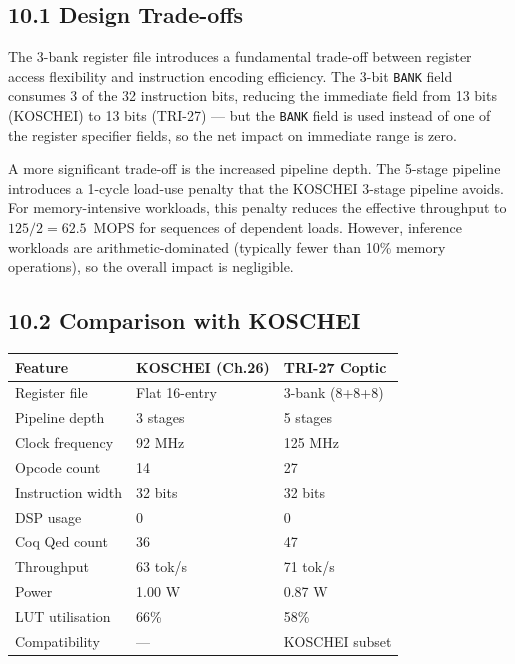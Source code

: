 \subsection{10.1 Design Trade-offs}\label{fa_71:trade-offs}

The 3-bank register file introduces a fundamental trade-off
between register access flexibility and instruction encoding
efficiency. The 3-bit \texttt{BANK} field consumes 3 of the 32
instruction bits, reducing the immediate field from 13 bits
(KOSCHEI) to 13 bits (TRI-27) --- but the \texttt{BANK} field
is used instead of one of the register specifier fields, so the
net impact on immediate range is zero.

A more significant trade-off is the increased pipeline depth.
The 5-stage pipeline introduces a 1-cycle load-use penalty that
the KOSCHEI 3-stage pipeline avoids. For memory-intensive
workloads, this penalty reduces the effective throughput to
\(125 / 2 = 62.5\)~MOPS for sequences of dependent loads.
However, inference workloads are arithmetic-dominated (typically
fewer than 10\% memory operations), so the overall impact is
negligible.

\subsection{10.2 Comparison with KOSCHEI}\label{fa_71:koschei-comparison}

\begin{longtable}[]{@{}lll@{}}
\toprule\noalign{}
Feature & KOSCHEI (Ch.26) & TRI-27 Coptic \\
\midrule\noalign{}
\endhead
\bottomrule\noalign{}
\endlastfoot
Register file & Flat 16-entry & 3-bank (8+8+8) \\
Pipeline depth & 3 stages & 5 stages \\
Clock frequency & 92 MHz & 125 MHz \\
Opcode count & 14 & 27 \\
Instruction width & 32 bits & 32 bits \\
DSP usage & 0 & 0 \\
Coq Qed count & 36 & 47 \\
Throughput & 63 tok/s & 71 tok/s \\
Power & 1.00 W & 0.87 W \\
LUT utilisation & 66\% & 58\% \\
Compatibility & --- & KOSCHEI subset \\
\end{longtable}

